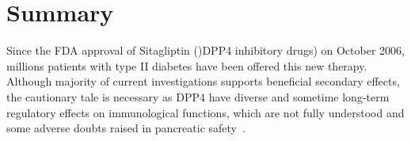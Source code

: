 \section{\label{chap:Sum} Summary}
Since the FDA approval of Sitagliptin ()DPP4 inhibitory drugs) on October 2006, millions patients with type II diabetes have been offered this new therapy. Although majority of current investigations supports beneficial secondary effects, the cautionary tale is necessary as DPP4 have diverse and sometime long-term regulatory effects on immunological functions, which are not fully understood and some adverse doubts raised in pancreatic safety~. 
